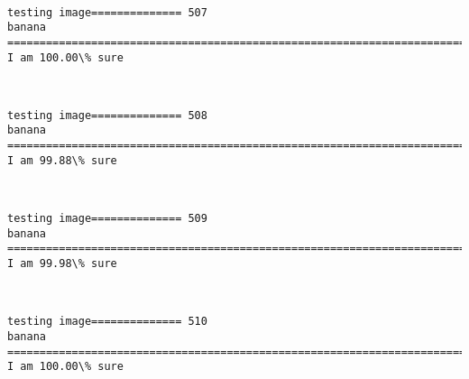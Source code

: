 \documentclass[11pt]{article}
\begin{document}
    \begin{center}
    \end{center}
    { \hspace*{\fill} \\}
    
    \begin{Verbatim}[commandchars=\\\{\}]
testing image============== 507
banana
============================================================================
I am 100.00\% sure

    \end{Verbatim}

    \begin{center}
    \end{center}
    { \hspace*{\fill} \\}
    
    \begin{Verbatim}[commandchars=\\\{\}]
testing image============== 508
banana
============================================================================
I am 99.88\% sure

    \end{Verbatim}

    \begin{center}
    \end{center}
    { \hspace*{\fill} \\}
    
    \begin{Verbatim}[commandchars=\\\{\}]
testing image============== 509
banana
============================================================================
I am 99.98\% sure

    \end{Verbatim}

    \begin{center}
    \end{center}
    { \hspace*{\fill} \\}
    
    \begin{Verbatim}[commandchars=\\\{\}]
testing image============== 510
banana
============================================================================
I am 100.00\% sure

    \end{Verbatim}
\end{document}
